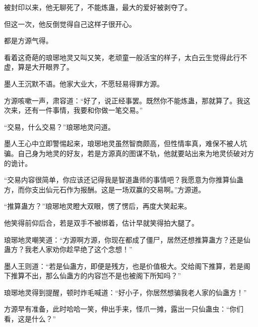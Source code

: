 \begin{this_body}
被封印以来，他无聊死了，不能炼蛊，最大的爱好被剥夺了。

但这一次，他反倒觉得自己这样子很开心。

都是方源气得。

看着这奇葩的琅琊地灵又叫又笑，老顽童一般活宝的样子，太白云生觉得此行不虚，算是大开眼界了。

墨人王沉默不语。他家大业大，不愿轻易得罪方源。

方源咳嗽一声，肃容道：“好了，说正经事罢。既然你不能炼蛊，那就算了。我这次来，还有一件事情，我要和你做一笔交易。”

“交易，什么交易？”琅琊地灵问道。

墨人王心中立即警惕起来，琅琊地灵虽然智商颇高，但性情率真，难保不被人坑骗。自己身为地灵的好友，若是方源真的图谋不轨，他就要站出来为地灵侦破对方的诡计。

“交易内容很简单，你应该还记得我是智道蛊师的事情吧？我愿意为你推算仙蛊方，而你支出仙元石作为报酬。这是一场双赢的交易啊。”方源道。

“推算蛊方？”琅琊地灵瞪大双眼，愣了愣后，再度大笑起来。

他笑得前仰后合，若是双手不被绑着，估计早就笑得拍大腿了。

琅琊地灵嘲笑道：“方源啊方源，你现在都成了僵尸，居然还想推算蛊方？还是仙蛊方？我老人家劝你趁早绝了这个念想！”

墨人王则道：“若是仙蛊方，即便是残方，也是价值极大。交给阁下推算，若是阁下推算不出，那么仙蛊方的内容岂不是也被阁下所知吗？”

琅琊地灵得到提醒，顿时炸毛喊道：“好小子，你居然想骗我老人家的仙蛊方！”

方源早有准备，此时哈哈一笑，伸出手来，怪爪一摊，露出一只仙蛊虫：“你们看，这是什么？”

\end{this_body}

